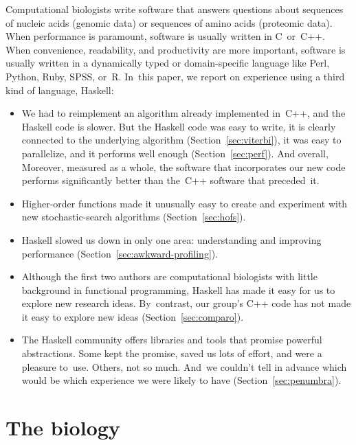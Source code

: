 \documentclass[nonatbib,preprint,blockstyle,times]{sigplanconf}
\newcommand\secref[1]{Section~\ref{sec:#1}}
\begin{document}
Computational biologists write software that answers questions about 
sequences of nucleic acids (genomic data) or sequences of amino 
acids (proteomic data). 
When performance is paramount,
software is usually written in C~or~C++. 
When convenience, readability, and
productivity are more important,
software is usually written in a dynamically typed
or domain-specific language like
Perl, Python, Ruby, SPSS, or~R.
In~this paper, we report on experience using a third kind of language,
Haskell: 
\begin{itemize}
\item
We had to reimplement an
algorithm already implemented in~C++, 
and the Haskell code is slower.
But the Haskell code was easy to write,     %
it is clearly connected to the underlying
algorithm (\secref{viterbi}),
it was easy to parallelize,
and it performs well enough
(\secref{perf}).
\ifpagetuning
And overall,
\else
Moreover, measured as a whole, 
\fi
the software that incorporates our new
code 
performs significantly
better than the~C++ software that preceded~it.
\item
Higher-order functions made it unusually easy to
create and experiment with new stochastic-search algorithms
(\secref{hofs}).
\item
Haskell slowed us down in only one area:  understanding and
improving
performance (\secref{awkward-profiling}).
\item
Although the first two authors are computational
biologists with little background in functional programming,
Haskell has made it easy for us to explore new research ideas.
By~contrast,
our group's C++ code has not
made it easy to explore
new ideas
(\secref{comparo}).
\item
The Haskell community offers libraries and tools that
promise powerful abstractions.
Some kept the promise, saved us lots of effort, and were a pleasure
to~use.
Others, not so much.
And~we couldn't tell in advance which 
\ifpagetuning
would be which
\else
experience we were likely to have
\fi
 (\secref{penumbra}).
\end{itemize}




\section{The biology}
\end{document}
